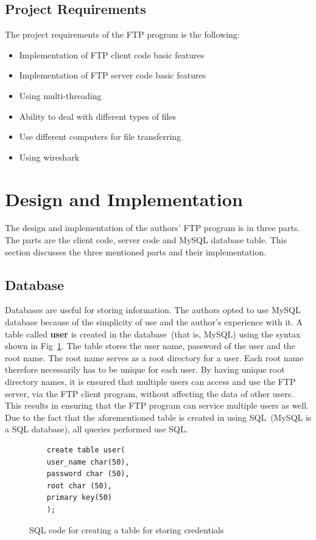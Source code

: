 \documentclass[journal, a4paper]{IEEEtran}
\begin{document}
\subsection{Project Requirements}
The project requirements of the FTP program is the following:

\begin{itemize}
	\item  Implementation of FTP client code basic features
	\item  Implementation of FTP server code basic features
	\item  Using multi-threading
	\item  Ability to deal with different types of files
	\item  Use different computers for file transferring
	\item  Using wireshark
\end{itemize}

\section{Design and Implementation}
The design and implementation of the authors' FTP program is in three parts. The parts are the client code, server code and MySQL database table. This section discusses the three mentioned parts and their implementation.

\subsection{Database}

Databases are useful for storing information. The authors opted to use MySQL database because of the simplicity of use and the author's experience with it. A table called \textbf{user} is created in the database~(that is, MySQL) using the syntax shown in Fig~\ref{sqltable}. The table stores the user name, password of the user and the root name. The root name serves as a root directory for a user. Each root name therefore necessarily has to be unique for each user. By having unique root directory names, it is ensured that multiple users can access and use the FTP server, via the FTP client program, without affecting the data of other users. This results in ensuring that the FTP program can service multiple users as well. Due to the fact that the aforementioned table is created in using SQL~(MySQL is a SQL database), all queries performed use SQL.

\begin{figure}[hbtp]
	\begin{lstlisting}
	create table user(
	user_name char(50),
	password char (50),
	root char (50),
	primary key(50)
	);
	\end{lstlisting}
	\caption{SQL code for creating a table for storing credentials}
	\label {sqltable}
\end{figure}
\end{document}
